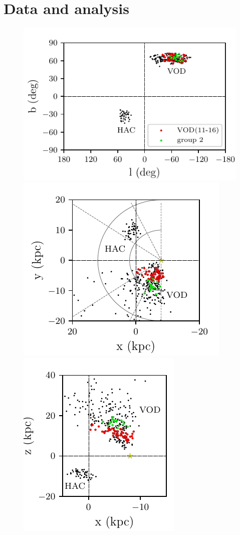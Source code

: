 \documentclass[fleqn,usenatbib]{mnras}
\begin{document}
\section{Data and analysis}
%
\begin{figure}
	\includegraphics[scale=0.61]{lb.pdf}
	\includegraphics[scale=0.61]{xy.pdf}
	\includegraphics[scale=0.61]{xz.pdf}

\end{figure}
\end{document}
